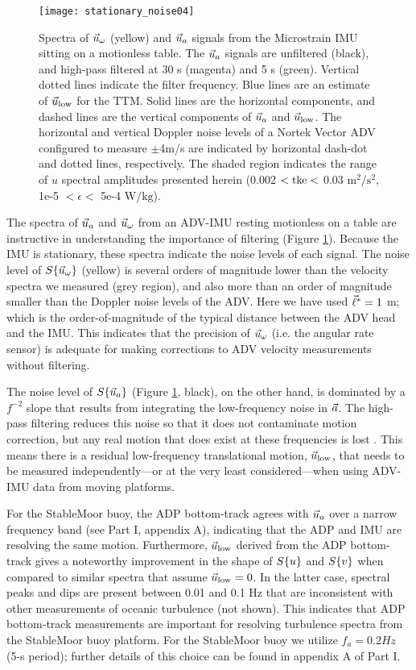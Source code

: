 \begin{figure}
  \centering
  \texttt{[image: stationary\_noise04]}
  \caption{Spectra of $\vec{u}_\omega$ (yellow) and $\vec{u}_a$ signals from the Microstrain IMU sitting on a motionless table. The $\vec{u}_a$ signals are unfiltered (black), and high-pass filtered at 30 s (magenta) and 5 s (green). Vertical dotted lines indicate the filter frequency.  Blue lines are an estimate of $\vec{u}_\mathrm{low}$ for the TTM. Solid lines are the horizontal components, and dashed lines are the vertical components of $\vec{u}_a$ and $\vec{u}_\mathrm{low}$. The horizontal and vertical Doppler noise levels of a Nortek Vector ADV configured to measure $\pm$4m/s are indicated by horizontal dash-dot and dotted lines, respectively. The shaded region indicates the range of $u$ spectral amplitudes presented herein (0.002 $< \mathrm{tke} <$ 0.03 $\mathrm{m^2/s^2}$, 1e-5 $< \epsilon <$ 5e-4 $\mathrm{W/kg}$).}
  \label{fig:stnoise}
\end{figure}

The spectra of $\vec{u}_a$ and $\vec{u}_\omega$ from an ADV-IMU resting motionless on a table are instructive in understanding the importance of filtering (Figure \ref{fig:stnoise}). Because the IMU is stationary, these spectra indicate the noise levels of each signal.  The noise level of $S\{\vec{u}_\omega\}$ (yellow) is several orders of magnitude lower than the velocity spectra we measured (grey region), and also more than an order of magnitude smaller than the Doppler noise levels of the ADV. Here we have used $\vec{\ell}^*=1$ m; which is the order-of-magnitude of the typical distance between the ADV head and the IMU. This indicates that the precision of $\vec{u}_\omega$ (i.e. the angular rate sensor) is adequate for making corrections to ADV velocity measurements without filtering.

The noise level of $S\{\vec{u}_a\}$ (Figure \ref{fig:stnoise}, black), on the other hand, is dominated by a $f^{-2}$ slope that results from integrating the low-frequency noise in ${\vec{a}}$. The high-pass filtering reduces this noise so that it does not contaminate motion correction, but any real motion that does exist at these frequencies is lost \cite[]{EgelandPhD2014, VanZwieten++2015}. This means there is a residual low-frequency translational motion, $\vec{u}_\mathrm{low}$, that needs to be measured independently---or at the very least considered---when using ADV-IMU data from moving platforms. 

For the StableMoor buoy, the ADP bottom-track agrees with $\vec{u}_a$ over a narrow frequency band (see Part I, appendix A), indicating that the ADP and IMU are resolving the same motion. Furthermore, $\vec{u}_\mathrm{low}$ derived from the ADP bottom-track gives a noteworthy improvement in the shape of $S\{u\}$ and $S\{v\}$ when compared to similar spectra that assume $\vec{u}_\mathrm{low}=0$. In the latter case, spectral peaks and dips are present between 0.01 and 0.1 Hz that are inconsistent with other measurements of oceanic turbulence (not shown). This indicates that ADP bottom-track measurements are important for resolving turbulence spectra from the StableMoor buoy platform. For the StableMoor buoy we utilize $f_a = 0.2 Hz$ (5-s period); further details of this choice can be found in appendix A of Part I.

